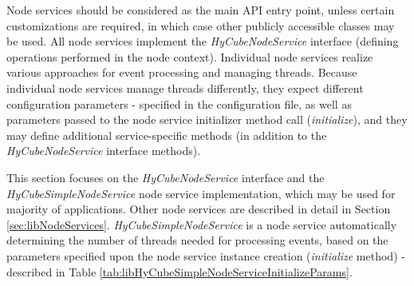 Node services should be considered as the main API entry point, unless certain customizations are required, in which case other publicly accessible classes may be used. All node services implement the \emph{HyCubeNodeService} interface (defining operations performed in the node context). Individual node services realize various approaches for event processing and managing threads. Because individual node services manage threads differently, they expect different configuration parameters - specified in the configuration file, as well as parameters passed to the node service initializer method call (\emph{initialize}), and they may define additional service-specific methods (in addition to the \emph{HyCubeNodeService} interface methods).

This section focuses on the \emph{HyCubeNodeService} interface and the \emph{HyCubeSimpleNodeService} node service implementation, which may be used for majority of applications. Other node services are described in detail in Section \ref{sec:libNodeServices}. \emph{HyCubeSimpleNodeService} is a node service automatically determining the number of threads needed for processing events, based on the parameters specified upon the node service instance creation (\emph{initialize} method) - described in Table \ref{tab:libHyCubeSimpleNodeServiceInitializeParams}.


